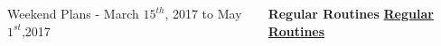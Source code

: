 \begin{columns}
\begin{column}{0.5\columnwidth}
\begin{block}{Weekend Plans - March $15^{th}$, 2017 to May $1^{st}$,2017}
\ifdefined\POSTER
\end{block}
\end{column}
\fi


\ifdefined\POSTER
\begin{column}{0.28\linewidth}
\begin{block}{\small \bf Regular Routines}
\else
\underline{\bf Regular Routines}\\ 
\fi 


%

\ifdefined\POSTER
\end{block}
\end{column}%
\fi

\ifdefined\POSTER
\end{columns}
\fi
